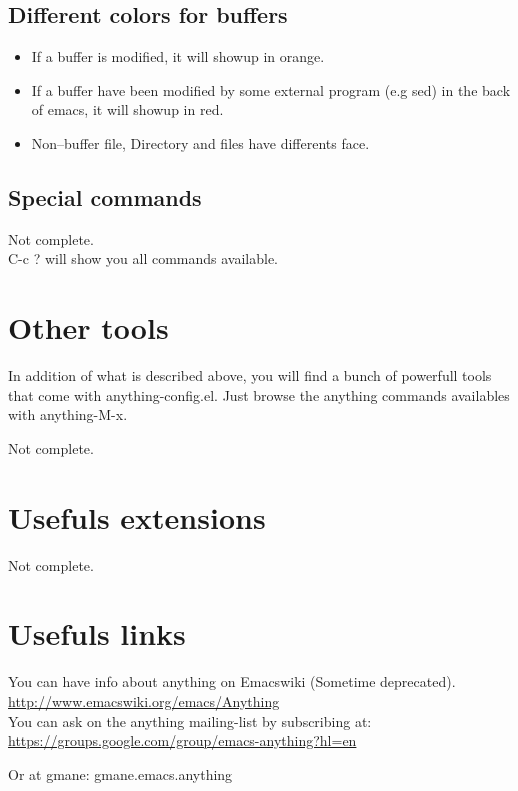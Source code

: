 \documentclass[a4paper,11pt]{article}
\begin{document}
\subsection{Different colors for buffers}
\label{sec:diff-colors-buff}

\begin{itemize}
\item If a buffer is modified, it will showup in orange.
\end{itemize}
\begin{itemize}
\item If a buffer have been modified by some external program (e.g sed) in the back of emacs, it will showup in red.  
\end{itemize}
\begin{itemize}
\item Non--buffer file, Directory and files have differents face.
\end{itemize}

\subsection{Special commands}
\label{sec:special-commands}
Not complete.\\

C-c ? will show you all commands available.


\section{Other tools}
\label{sec:other-tools}

In addition of what is described above, you will find a bunch of powerfull tools that come with anything-config.el.
Just browse the anything commands availables with anything-M-x.

Not complete.
\section{Usefuls extensions}
\label{sec:usefuls-extensions}
Not complete.

\section{Usefuls links}
\label{sec:usefuls-links}

You can have info about anything on Emacswiki (Sometime deprecated).\\
\url{http://www.emacswiki.org/emacs/Anything}\\

You can ask on the anything mailing-list by subscribing at:\\
\url{https://groups.google.com/group/emacs-anything?hl=en}

Or at gmane: gmane.emacs.anything
\end{document}
